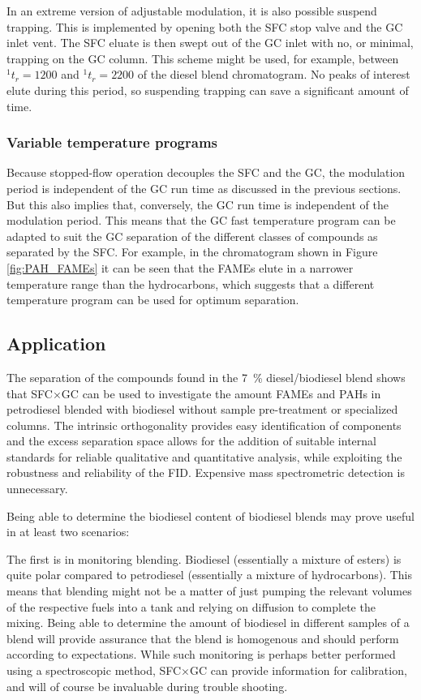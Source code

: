 In an extreme version of adjustable modulation, it is also possible  suspend
trapping. This is implemented by opening both the SFC stop valve and the GC
inlet vent. The SFC eluate is then swept out of the GC inlet with no, or
minimal, trapping on the GC column. This scheme might be used, for example,
between \(^{1}t_r = 1200\) and \(^{1}t_r = 2200\) of the diesel blend
chromatogram. No peaks of interest elute during this period, so suspending
trapping can save a significant amount of time.

\subsubsection{Variable temperature programs}

Because stopped-flow operation decouples the SFC and the GC, the modulation
period is independent of the GC run time as discussed in the previous sections.
But this also implies that, conversely,  the GC run time is independent of the
modulation period. This means that the GC fast temperature program can be
adapted to suit the GC separation of the different classes of compounds as
separated by the SFC. For example, in the chromatogram shown in Figure
\ref{fig:PAH_FAMEs} it can be seen that the FAMEs elute in a narrower
temperature range than the hydrocarbons, which suggests that a different
temperature program can be used for optimum separation.

\subsection{Application}

The separation of the compounds found in the \SI{7}{\percent} diesel/biodiesel
blend shows that SFC×GC can be used to investigate the amount FAMEs and PAHs in
petrodiesel blended with biodiesel without sample pre-treatment or specialized
columns. The intrinsic orthogonality provides easy identification of components
and the excess separation space allows for the addition of suitable internal
standards for reliable qualitative and quantitative analysis, while exploiting
the robustness and reliability of the FID. Expensive mass spectrometric
detection is unnecessary.

Being able to determine the biodiesel content of biodiesel blends may prove
useful in at least two scenarios: 

The first is in monitoring blending. Biodiesel (essentially a mixture of esters)
is quite polar compared to petrodiesel (essentially a mixture of hydrocarbons).
This means that blending might not be a matter of just pumping the relevant
volumes of the respective fuels into a tank and relying on diffusion to complete
the mixing. Being able to determine the amount of biodiesel in different samples
of a blend will provide assurance that the blend is homogenous and should
perform according to expectations. While such monitoring is perhaps better
performed using a spectroscopic method, SFC×GC can provide information for
calibration, and will of course be invaluable during trouble shooting.

